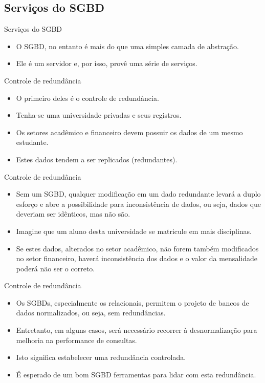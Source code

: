 \documentclass[11pt]{beamer}
\begin{document}
\subsection{Serviços do SGBD}

\begin{frame}{Serviços do SGBD}
    \begin{itemize}
        \item O SGBD, no entanto é mais do que uma simples camada de abstração.
        \item Ele é um servidor e, por isso, provê uma série de serviços.
    \end{itemize}
\end{frame}

\begin{frame}{Controle de redundância}
    \begin{itemize}
        \item O primeiro deles é o controle de redundância.
        \item Tenha-se uma universidade privadas e seus registros.
        \item Os setores acadêmico e financeiro devem possuir os dados de um mesmo estudante.
        \item Estes dados tendem a ser replicados (redundantes).
    \end{itemize}
\end{frame}

\begin{frame}{Controle de redundância}
    \begin{itemize}
        \item Sem um SGBD, qualquer modificação em um dado redundante levará a duplo esforço e abre a possibilidade para inconsistência de dados, ou seja, dados que deveriam ser idênticos, mas não são.
        \item Imagine que um aluno desta universidade se matricule em mais disciplinas.
        \item Se estes dados, alterados no setor acadêmico, não forem também modificados no setor financeiro, haverá inconsistência dos dados e o valor da mensalidade poderá não ser o correto.
    \end{itemize}
\end{frame}

\begin{frame}{Controle de redundância}
    \begin{itemize}
        \item Os SGBDs, especialmente os relacionais, permitem o projeto de bancos de dados normalizados, ou seja, sem redundâncias.
        \item Entretanto, em alguns casos, será necessário recorrer à desnormalização para melhoria na performance de consultas.
        \item Isto significa estabelecer uma redundância controlada.
        \item É esperado de um bom SGBD ferramentas para lidar com esta redundância.
    \end{itemize}
\end{frame}
\end{document}
